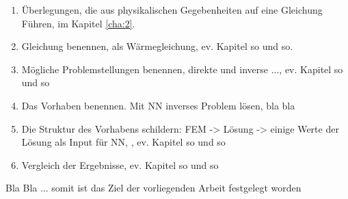 \begin{enumerate}
	\item Überlegungen, die aus physikalischen Gegebenheiten auf eine Gleichung Führen, im Kapitel \ref{cha:2}.
	\item Gleichung benennen, als Wärmegleichung, ev. Kapitel so und so.
	\item Mögliche Problemstellungen benennen, direkte und inverse ..., ev. Kapitel so und so
	\item Das Vorhaben benennen. Mit NN inverses Problem lösen, bla bla
	\item Die Struktur des Vorhabens schildern: FEM -> Lösung -> einige Werte der Lösung als Input für NN, , ev. Kapitel so und so
	\item Vergleich der Ergebnisse, ev. Kapitel so und so
\end{enumerate}
 Bla Bla ... somit ist das Ziel der vorliegenden Arbeit festgelegt worden
